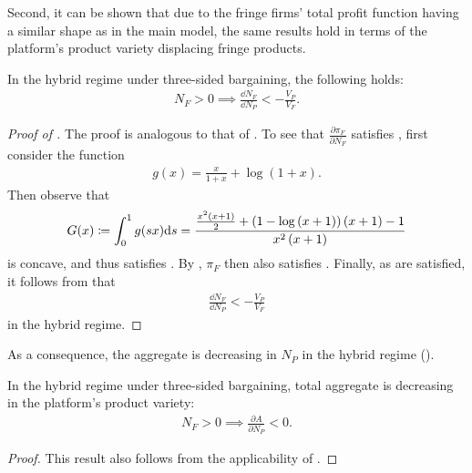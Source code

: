 Second, it can be shown that due to the fringe firms' total profit function having a similar shape as in the main model, the same results hold in terms of the platform's product variety displacing fringe products.
\begin{proposition}
    \label{prop:fringe_entry_two_sided}
    In the hybrid regime under three-sided bargaining, the following holds:
    \begin{align*}
        N_F > 0 \implies \frac{\dd N_F}{\dd N_P} < -\frac{V_P}{V_F}.
    \end{align*}
\end{proposition}
\begin{proof}[Proof of ]
    The proof is analogous to that of .
    To see that $\frac{\partial \pi_F}{\partial N_F}$ satisfies , first consider the function
    \begin{align*}
        g(x) = \frac{x}{1 + x} + \log(1 + x).
    \end{align*}
    Then observe that
    \begin{align*}
        G(x) \coloneq \int_0^1 g(sx) \mathrm{d}s = \frac{\frac{x^{2} \left(x + 1\right)}{2} + \left(1 - \log{\left(x + 1 \right)}\right) \left(x + 1\right) - 1}{x^{2} \left(x + 1\right)}
    \end{align*}
    is concave, and thus satisfies .
    By , $\pi_F$ then also satisfies .
    Finally, as  are satisfied, it follows from  that
    \begin{align*}
        \frac{\dd N_F}{\dd N_P} < -\frac{V_P}{V_F}
    \end{align*}
    in the hybrid regime.
    
\end{proof}

As a consequence, the aggregate is decreasing in $N_P$ in the hybrid regime ().
\begin{corollary}
    In the hybrid regime under three-sided bargaining, total aggregate is decreasing in the platform's product variety:
    \begin{align*}
        N_F > 0 \implies \frac{\partial A}{\partial N_P} < 0.
    \end{align*}
\end{corollary}
\begin{proof}
    This result also follows from the applicability of .
\end{proof}

